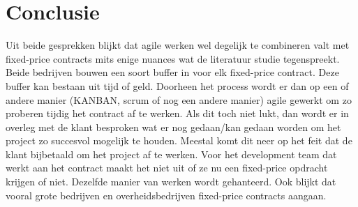 \documentclass{hogent-article}
\begin{document}
	
	\section{Conclusie}
	Uit beide gesprekken blijkt dat agile werken wel degelijk te combineren valt met fixed-price contracts mits enige nuances wat de literatuur studie tegenspreekt. Beide bedrijven bouwen een soort buffer in voor elk fixed-price contract. Deze buffer kan bestaan uit tijd of geld. Doorheen het process wordt er dan op een of andere manier (KANBAN, scrum of nog een andere manier) agile gewerkt om zo proberen tijdig het contract af te werken. Als dit toch niet lukt, dan wordt er in overleg met de klant besproken wat er nog gedaan/kan gedaan worden om het project zo succesvol mogelijk te houden. Meestal komt dit neer op het feit dat de klant bijbetaald om het project af te werken. Voor het development team dat werkt aan het contract maakt het niet uit of ze nu een fixed-price opdracht krijgen of niet. Dezelfde manier van werken wordt gehanteerd. Ook blijkt dat vooral grote bedrijven en overheidsbedrijven fixed-price contracts aangaan.

	
	
	\printbibliography[heading=bibintoc]
	
\end{document}
